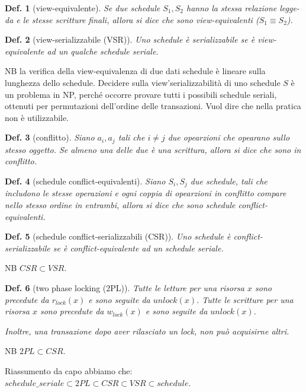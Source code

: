 \documentclass{article}
\newtheorem{definition}{Def.}[section]
\begin{document}
\begin{definition}[view-equivalente]
	Se due schedule $S_1, S_2$ hanno la stessa relazione legge-da e le stesse 
	scritture finali, allora si dice che sono
	view-equivalenti ($S_1 \equiv S_2$).
\end{definition}

\begin{definition}[view-serializzabile (VSR)]
	Uno schedule è serializzabile se è view-equivalente ad un qualche schedule 
	seriale.
\end{definition}

NB la verifica della view-equivalenza di due dati schedule è lineare sulla
lunghezza dello schedule. Decidere sulla view'serializzabilità di uno schedule
$S$ è un problema in NP, perché occorre provare tutti i possibili schedule
seriali, ottenuti per permutazioni dell'ordine delle transazioni. Vuol dire che
nella pratica non è utilizzabile.

\begin{definition}[conflitto]
	Siano $a_i, a_j$ tali che $i \neq j$ due opearzioni che opearano sullo
	stesso oggetto. Se almeno una delle due è una scrittura, allora si dice che
	sono in conflitto.
\end{definition}

\begin{definition}[schedule conflict-equivalenti]
	Siano $S_i, S_j$ due schedule, tali che includono le stesse operazioni e 
	ogni coppia di opearzioni in conflitto compare nello stesso ordine in 
	entrambi, allora si dice che sono schedule conflict-equivalenti.
\end{definition}

\begin{definition}[schedule conflict-serializzabili (CSR)]
	Uno schedule è conflict-serializzabile se è conflict-equivalente ad un 
	schedule seriale.
\end{definition}

NB $CSR \subset VSR$.

\begin{definition}[two phase locking (2PL)]
	Tutte le letture per una risorsa $x$ sono precedute da $r_{lock}(x)$ e sono
	seguite da $unlock(x)$. Tutte le scritture per una risorsa $x$ sono 
	precedute da $w_{lock}(x)$ e sono seguite da $unlock(x)$.

	Inoltre, una transazione dopo aver rilasciato un lock, non può acquisirne
	altri.
\end{definition}

NB $2PL \subset CSR$.

Riassumento da capo abbiamo che: $schedule\_seriale \subset 2PL \subset CSR
\subset VSR \subset schedule$.
\end{document}
